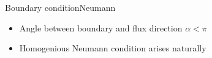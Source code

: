 %
%
%
%
%

\begin{frame}{Boundary condition}{Neumann}
  \begin{itemize}
  \item Angle between boundary and flux direction $\alpha<\pi$
  \item Homogenious Neumann condition arises naturally
  \end{itemize}
  \vfill
  \centering
\end{frame}

